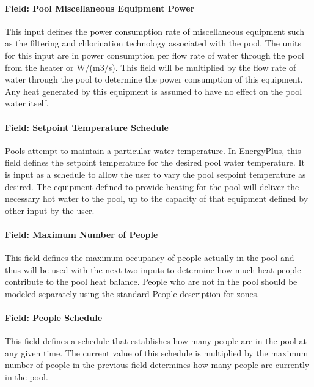 \paragraph{Field: Pool Miscellaneous Equipment Power}\label{field-pool-miscellaneous-equipment-power}

This input defines the power consumption rate of miscellaneous equipment such as the filtering and chlorination technology associated with the pool. The units for this input are in power consumption per flow rate of water through the pool from the heater or W/(m3/s). This field will be multiplied by the flow rate of water through the pool to determine the power consumption of this equipment. Any heat generated by this equipment is assumed to have no effect on the pool water itself.

\paragraph{Field: Setpoint Temperature Schedule}\label{field-setpoint-temperature-schedule}

Pools attempt to maintain a particular water temperature. In EnergyPlus, this field defines the setpoint temperature for the desired pool water temperature. It is input as a schedule to allow the user to vary the pool setpoint temperature as desired. The equipment defined to provide heating for the pool will deliver the necessary hot water to the pool, up to the capacity of that equipment defined by other input by the user.

\paragraph{Field: Maximum Number of People}\label{field-maximum-number-of-people}

This field defines the maximum occupancy of people actually in the pool and thus will be used with the next two inputs to determine how much heat people contribute to the pool heat balance. \hyperref[people]{People} who are not in the pool should be modeled separately using the standard \hyperref[people]{People} description for zones.

\paragraph{Field: People Schedule}\label{field-people-schedule}

This field defines a schedule that establishes how many people are in the pool at any given time. The current value of this schedule is multiplied by the maximum number of people in the previous field determines how many people are currently in the pool.

